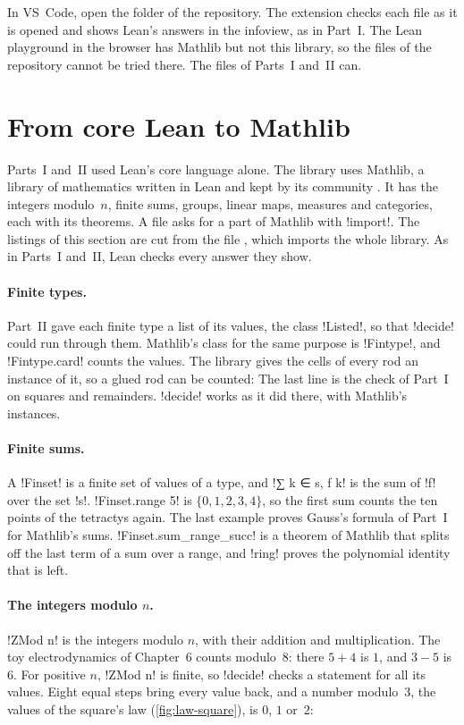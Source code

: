 In VS~Code, open the folder of the repository. The extension checks each
file as it is opened and shows Lean's answers in the infoview, as in
Part~I. The Lean playground in the browser has Mathlib but not this
library, so the files of the repository cannot be tried there. The files
of Parts~I and~II can.

\section*{From core Lean to Mathlib}

Parts~I and~II used Lean's core language alone. The library uses Mathlib, a
library of mathematics written in Lean and kept by its community
\cite{Mathlib2020}. It has the integers modulo~$n$, finite sums, groups,
linear maps, measures and categories, each with its theorems. A file asks
for a part of Mathlib with \li!import!. The listings of this section are cut
from the file , which imports the whole library. As
in Parts~I and~II, Lean checks every answer they show.

\paragraph{Finite types.}
Part~II gave each finite type a list of its values, the class \li!Listed!,
so that \li!decide! could run through them. Mathlib's class for the same
purpose is \li!Fintype!, and \li!Fintype.card! counts the values. The
library gives the cells of every rod an instance of it, so a glued rod can
be counted:
The last line is the check of Part~I on squares and remainders. \li!decide!
works as it did there, with Mathlib's instances.

\paragraph{Finite sums.}
A \li!Finset! is a finite set of values of a type, and
\li!∑ k ∈ s, f k! is the sum of \li!f! over the set \li!s!.
\li!Finset.range 5! is $\{0,1,2,3,4\}$, so the first sum counts the ten
points of the tetractys again. The last example proves Gauss's formula of
Part~I for Mathlib's sums. \li!Finset.sum_range_succ! is a theorem of
Mathlib that splits off the last term of a sum over a range, and \li!ring!
proves the polynomial identity that is left.

\paragraph{The integers modulo $n$.}
\li!ZMod n! is the integers modulo $n$, with their addition and
multiplication. The toy electrodynamics of Chapter~6 counts modulo~$8$:
there $5+4$ is $1$, and $3-5$ is $6$. For positive $n$, \li!ZMod n! is finite, so \li!decide!
checks a statement for all its values. Eight equal steps bring every value
back, and a number modulo~$3$, the values of the square's law
(\cref{fig:law-square}), is $0$, $1$ or~$2$:

